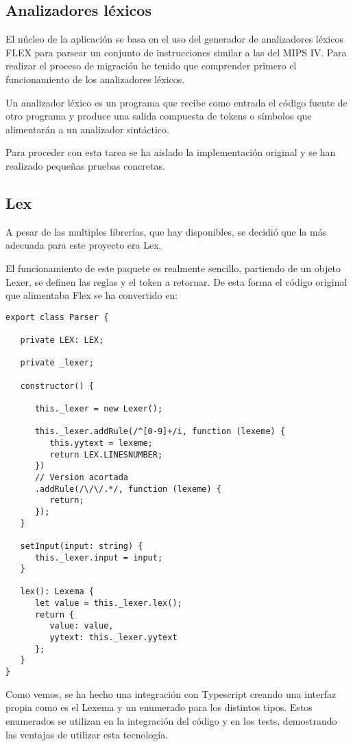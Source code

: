 \subsection{Analizadores léxicos}
El núcleo de la aplicación se basa en el uso del generador de analizadores 
léxicos FLEX para parsear un conjunto de instrucciones similar a las del MIPS IV. 
Para realizar el proceso de migración he tenido que comprender primero el 
funcionamiento de los analizadores léxicos.

\bigskip
Un analizador léxico es un programa que recibe como entrada el código fuente de 
otro programa y produce una salida compuesta de tokens o símbolos 
que alimentarán a un analizador sintáctico.

\bigskip
Para proceder con esta tarea se ha aislado la implementación original y se han 
realizado pequeñas pruebas concretas.

\subsection{Lex}

A pesar de las multiples librerías, que hay disponibles, se decidió que la más adecuada 
para este proyecto era Lex\cite{Lex}. 

El funcionamiento de este paquete es realmente sencillo, partiendo de un 
objeto Lexer, se definen las reglas y el token a retornar. De esta forma
el código original que alimentaba Flex se ha convertido en: 

\begin{lstlisting}
export class Parser {

   private LEX: LEX;

   private _lexer;

   constructor() {

      this._lexer = new Lexer();

      this._lexer.addRule(/^[0-9]+/i, function (lexeme) {
         this.yytext = lexeme;
         return LEX.LINESNUMBER;
      })
      // Version acortada
      .addRule(/\/\/.*/, function (lexeme) {
         return;
      });
   }

   setInput(input: string) {
      this._lexer.input = input;
   }

   lex(): Lexema {
      let value = this._lexer.lex();
      return {
         value: value,
         yytext: this._lexer.yytext
      };
   }
}
\end{lstlisting}

Como vemos, se ha hecho una integración con Typescript creando una interfaz propia como es 
el Lexema y un enumerado para los distintos tipos. Estos enumerados se utilizan en la integración 
del código y en los tests, demostrando las ventajas de utilizar esta tecnología.
